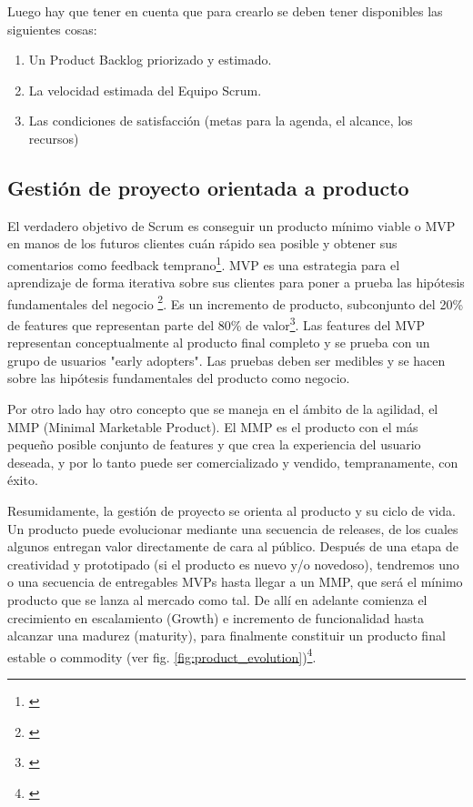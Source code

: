 Luego hay que tener en cuenta que para crearlo se deben tener disponibles las siguientes cosas:

\begin{enumerate}
\item Un Product Backlog priorizado y estimado.
\item La velocidad estimada del Equipo Scrum.
\item Las condiciones de satisfacción (metas para la agenda, el alcance, los recursos)
\end{enumerate}

\subsection{Gestión de proyecto orientada a producto}

El verdadero objetivo de Scrum es conseguir un producto mínimo viable o MVP en manos de los futuros clientes cuán rápido sea posible y obtener sus comentarios como feedback temprano\footnote{\cite{Jeff-Sutherland-2016}}. MVP es una estrategia para el aprendizaje de forma iterativa sobre sus clientes para poner a prueba las hipótesis fundamentales del negocio \footnote{\cite{Greg-Gehrich-2012}}. Es un incremento de producto, subconjunto del 20\% de features que representan parte del 80\% de valor\footnote{\cite{Jeff-Sutherland-2016}}. Las features del MVP representan conceptualmente al producto final completo y se prueba con un grupo de usuarios "early adopters". Las pruebas deben ser medibles y se hacen sobre las hipótesis fundamentales del producto como negocio.

Por otro lado hay otro concepto que se maneja en el ámbito de la agilidad, el MMP (Minimal Marketable Product). El MMP es el producto con el más pequeño posible conjunto de features y que crea la experiencia del usuario deseada, y por lo tanto puede ser comercializado y vendido, tempranamente, con éxito.

Resumidamente, la gestión de proyecto se orienta al producto y su ciclo de vida. Un producto puede evolucionar mediante una secuencia de releases, de los cuales algunos entregan valor directamente de cara al público. Después de una etapa de creatividad y prototipado (si el producto es nuevo y/o novedoso), tendremos uno o una secuencia de entregables MVPs hasta llegar a un MMP, que será el mínimo producto que se lanza al mercado como tal. De allí en adelante comienza el crecimiento en escalamiento (Growth) e incremento de funcionalidad hasta alcanzar una madurez (maturity), para finalmente constituir un producto final estable o commodity (ver fig. \ref{fig:product_evolution})\footnote{\cite{Greg-Gehrich-2012}}.

